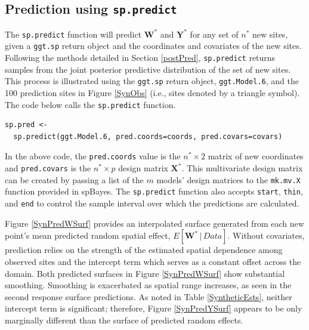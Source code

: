 \documentclass[a4paper]{article}
\newcommand{\bW}{\textbf{W}}
\newcommand{\bX}{\textbf{X}}
\newcommand{\bY}{\textbf{Y}}
\let\code=\texttt
\newcommand{\pkg}[1]{{\normalfont\fontseries{b}\selectfont #1}}
\begin{document}
\subsection[Prediction using sp.predict]{Prediction using \code{sp.predict}}
The \code{sp.predict} function will predict $\bW^{\ast}$ and
$\bY^{\ast}$ for any set of $n^{\ast}$ new sites, given a
\code{ggt.sp} return object and the coordinates and covariates of
the new sites.  Following the methods detailed in Section
\ref{postPred}, \code{sp.predict} returns samples from the joint
posterior predictive distribution of the set of new sites.  This
process is illustrated using the \code{ggt.sp} return object,
\code{ggt.Model.6}, and the 100 prediction sites in Figure
\ref{SynObs} (i.e., sites denoted by a triangle symbol).  The code
below calls the \code{sp.predict} function. 
\begin{verbatim}
sp.pred <-
  sp.predict(ggt.Model.6, pred.coords=coords, pred.covars=covars)
\end{verbatim}
In the above code, the \code{pred.coords} value is the
$n^{\ast}\times 2$ matrix of new coordinates and \code{pred.covars}
is the $n^{\ast}\times p$ design matrix $\bX^{\ast}$.  This
multivariate design matrix can be created by passing a list of the
$m$ models' design matrices to the \code{mk.mv.X} function provided
in \pkg{spBayes}. The \code{sp.predict} function also accepts \code{start}, \code{thin}, and \code{end} to control the sample interval over which the predictions are calculated.

Figure \ref{SynPredWSurf} provides an interpolated surface generated from each new point's mean predicted random spatial effect, $E[\bW^{\ast}\,|\, Data]$.  Without covariates, prediction relies on the strength of the estimated spatial dependence among observed sites and the intercept term which serves as a constant offset across the domain.  Both predicted surfaces in Figure \ref{SynPredWSurf} show substantial smoothing.  Smoothing is exacerbated as spatial range increases, as seen in the second response surface predictions.  As noted in Table \ref{SyntheticEsts}, neither intercept term is significant; therefore, Figure \ref{SynPredYSurf} appears to be only marginally different than the surface of predicted random effects.
\end{document}
